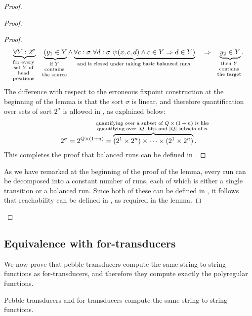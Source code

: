 \begin{proof}
\begin{proof}
\begin{proof}
            \begin{align*}
        \myunderbrace{\forall Y : 2^\sigma}{for every \\ set $Y$ of \\ head\\ positions} 
        \quad 
        \myunderbrace{(y_1 \in Y}{if $Y$ \\ contains\\ the source} \land \myunderbrace{\forall c : \sigma \ \forall d : \sigma\  \psi(x,c,d) \land c \in Y \Rightarrow d \in Y)}{and is closed under  taking basic balanced runs} \quad \Rightarrow \quad \myunderbrace{y_2 \in Y}{then  $Y$ \\ contains\\ the target}.
        \end{align*}
    The difference with respect to the erroneous fixpoint construction at the beginning of the lemma is that the sort $\sigma$ is linear, and therefore quantification over sets of sort $2^\sigma$ is allowed in \mso, as explained below:
\begin{align*}
2^\sigma = 2^{Q \times (1+n)} = \myoverbrace{(2^{1} \times 2^{n}) \times \cdots \times (2^{1} \times 2^{n})}{quantifying over a subset of $Q \times (1+n)$ is like \\ quantifying over $|Q|$ bits and $|Q|$ subsets of $n$}.
\end{align*}
This completes the proof that balanced runs can be defined in \mso.
\end{proof}
As we have remarked at the beginning of the proof of the lemma, every run can be decomposed into a constant number of runs, each of which is either a single transition or a balanced run. Since both of these can be defined in \mso, it follows that reachability can be defined in \mso, as required in the lemma. 
    \end{proof}
\end{proof}




\subsection{Equivalence with for-transducers} 
We now prove that pebble transducers compute the same string-to-string functions as for-transducers, and therefore they compute exactly the polyregular functions.


\begin{theorem}\label{thm:pebble-are-for}
   Pebble transducers and for-transducers compute the same string-to-string functions.
\end{theorem}

